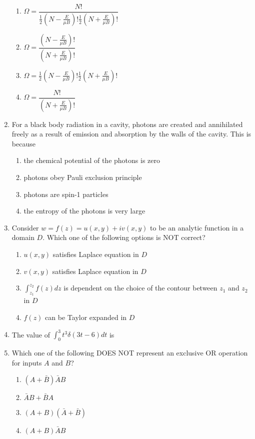 \documentclass[journal]{IEEEtran}
\newcommand{\brak}[1]{\left( #1 \right)}
\begin{document}
\begin{enumerate}
\begin{enumerate}
    \item $\Omega = \dfrac{N!}{\frac{1}{2}\brak{N - \frac{E}{\mu B}}!\frac{1}{2}\brak{N + \frac{E}{\mu B}}!}$
    \item $\Omega = \dfrac{\brak{N - \frac{E}{\mu B}}!}{\brak{N + \frac{E}{\mu B}}!}$
    \item $\Omega = \frac{1}{2}\brak{N - \frac{E}{\mu B}}!\frac{1}{2}\brak{N + \frac{E}{\mu B}}!$
    \item $\Omega = \dfrac{N!}{\brak{N + \frac{E}{\mu B}}!}$
\end{enumerate}

\item For a black body radiation in a cavity, photons are created and annihilated freely as a result of emission and absorption by the walls of the cavity. This is because  


\begin{enumerate}
    \item the chemical potential of the photons is zero
    \item photons obey Pauli exclusion principle
    \item photons are spin-1 particles
    \item the entropy of the photons is very large
\end{enumerate}

\item Consider $w = f\brak{z} = u\brak{x, y} + iv\brak{x, y}$ to be an analytic function in a domain $D$. Which one of the following options is NOT correct?

\begin{enumerate}
    \item $u\brak{x, y}$ satisfies Laplace equation in $D$
    \item $v\brak{x, y}$ satisfies Laplace equation in $D$
    \item $\int_{z_1}^{z_2} f\brak{z}dz$ is dependent on the choice of the contour between $z_1$ and $z_2$ in $D$
    \item $f\brak{z}$ can be Taylor expanded in $D$
\end{enumerate}

\item The value of $\int_{0}^{3}t^{3} \delta\brak{3t-6}dt$ is 
\item Which one of the following DOES NOT represent an exclusive OR operation for inputs $A$ and $B$?

\begin{enumerate}
    \item $\brak{A + \bar{B}}\bar{A}B$
    \item $\bar{A}B + \bar{B}A$
    \item $\brak{A + B}\brak{\bar{A} + \bar{B}}$
    \item $\brak{A + B}\bar{A}B$
\end{enumerate}


\end{enumerate}
\end{document}
